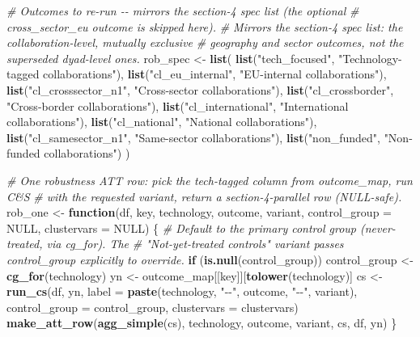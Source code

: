 \documentclass[
]{article}
\newenvironment{Shaded}{\begin{snugshade}}{\end{snugshade}}
\newcommand{\AttributeTok}[1]{\textcolor[rgb]{0.13,0.29,0.53}{#1}}
\newcommand{\CommentTok}[1]{\textcolor[rgb]{0.56,0.35,0.01}{\textit{#1}}}
\newcommand{\ConstantTok}[1]{\textcolor[rgb]{0.56,0.35,0.01}{#1}}
\newcommand{\ControlFlowTok}[1]{\textcolor[rgb]{0.13,0.29,0.53}{\textbf{#1}}}
\newcommand{\FunctionTok}[1]{\textcolor[rgb]{0.13,0.29,0.53}{\textbf{#1}}}
\newcommand{\NormalTok}[1]{#1}
\newcommand{\OtherTok}[1]{\textcolor[rgb]{0.56,0.35,0.01}{#1}}
\newcommand{\StringTok}[1]{\textcolor[rgb]{0.31,0.60,0.02}{#1}}
\begin{document}
\begin{Shaded}
\begin{Highlighting}[]
\CommentTok{\# Outcomes to re{-}run {-}{-} mirrors the section{-}4 spec list (the optional}
\CommentTok{\# cross\_sector\_eu outcome is skipped here).}
\CommentTok{\# Mirrors the section{-}4 spec list: the collaboration{-}level, mutually exclusive}
\CommentTok{\# geography and sector outcomes, not the superseded dyad{-}level ones.}
\NormalTok{rob\_spec }\OtherTok{\textless{}{-}} \FunctionTok{list}\NormalTok{(}
  \FunctionTok{list}\NormalTok{(}\StringTok{"tech\_focused"}\NormalTok{,      }\StringTok{"Technology{-}tagged collaborations"}\NormalTok{),}
  \FunctionTok{list}\NormalTok{(}\StringTok{"cl\_eu\_internal"}\NormalTok{,    }\StringTok{"EU{-}internal collaborations"}\NormalTok{),}
  \FunctionTok{list}\NormalTok{(}\StringTok{"cl\_crosssector\_n1"}\NormalTok{, }\StringTok{"Cross{-}sector collaborations"}\NormalTok{),}
  \FunctionTok{list}\NormalTok{(}\StringTok{"cl\_crossborder"}\NormalTok{,    }\StringTok{"Cross{-}border collaborations"}\NormalTok{),}
  \FunctionTok{list}\NormalTok{(}\StringTok{"cl\_international"}\NormalTok{,  }\StringTok{"International collaborations"}\NormalTok{),}
  \FunctionTok{list}\NormalTok{(}\StringTok{"cl\_national"}\NormalTok{,       }\StringTok{"National collaborations"}\NormalTok{),}
  \FunctionTok{list}\NormalTok{(}\StringTok{"cl\_samesector\_n1"}\NormalTok{,  }\StringTok{"Same{-}sector collaborations"}\NormalTok{),}
  \FunctionTok{list}\NormalTok{(}\StringTok{"non\_funded"}\NormalTok{,        }\StringTok{"Non{-}funded collaborations"}\NormalTok{)}
\NormalTok{)}

\CommentTok{\# One robustness ATT row: pick the tech{-}tagged column from outcome\_map, run C\&S}
\CommentTok{\# with the requested variant, return a section{-}4{-}parallel row (NULL{-}safe).}
\NormalTok{rob\_one }\OtherTok{\textless{}{-}} \ControlFlowTok{function}\NormalTok{(df, key, technology, outcome, variant,}
                    \AttributeTok{control\_group =} \ConstantTok{NULL}\NormalTok{, }\AttributeTok{clustervars =} \ConstantTok{NULL}\NormalTok{) \{}
  \CommentTok{\# Default to the primary control group (never{-}treated, via cg\_for). The}
  \CommentTok{\# "Not{-}yet{-}treated controls" variant passes control\_group explicitly to override.}
  \ControlFlowTok{if}\NormalTok{ (}\FunctionTok{is.null}\NormalTok{(control\_group)) control\_group }\OtherTok{\textless{}{-}} \FunctionTok{cg\_for}\NormalTok{(technology)}
\NormalTok{  yn }\OtherTok{\textless{}{-}}\NormalTok{ outcome\_map[[key]][}\FunctionTok{tolower}\NormalTok{(technology)]}
\NormalTok{  cs }\OtherTok{\textless{}{-}} \FunctionTok{run\_cs}\NormalTok{(df, yn,}
               \AttributeTok{label         =} \FunctionTok{paste}\NormalTok{(technology, }\StringTok{"{-}{-}"}\NormalTok{, outcome, }\StringTok{"{-}{-}"}\NormalTok{, variant),}
               \AttributeTok{control\_group =}\NormalTok{ control\_group,}
               \AttributeTok{clustervars   =}\NormalTok{ clustervars)}
  \FunctionTok{make\_att\_row}\NormalTok{(}\FunctionTok{agg\_simple}\NormalTok{(cs), technology, outcome, variant, cs, df, yn)}
\NormalTok{\}}


\end{Highlighting}
\end{Shaded}
\end{document}
